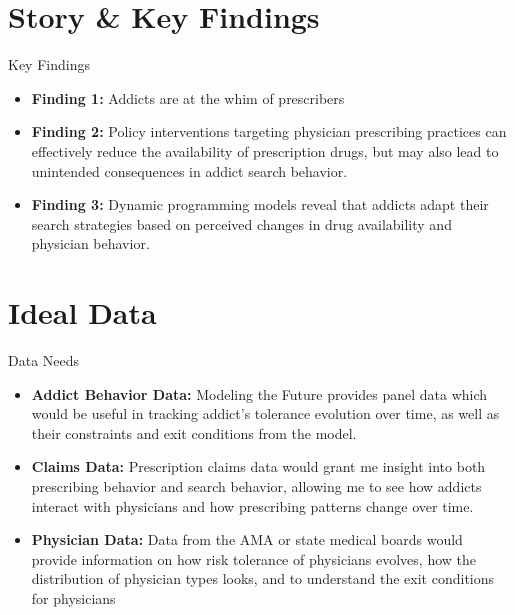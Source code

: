\documentclass[aspectratio=169,professionalfonts]{beamer}
\newcommand{\hl}[1]{\textbf{\textcolor{UGARed}{#1}}}
\begin{document}
\section{Story \& Key Findings}

\begin{frame}{Key Findings}
  \begin{itemize}
    \item \hl{Finding 1:} Addicts are at the whim of prescribers
    \item \hl{Finding 2:} Policy interventions targeting physician prescribing practices can effectively reduce the availability of prescription drugs, but may also lead to unintended consequences in addict search behavior.
    \item \hl{Finding 3:} Dynamic programming models reveal that addicts adapt their search strategies based on perceived changes in drug availability and physician behavior.
  \end{itemize}
\end{frame}


\section{Ideal Data}

  \begin{frame}{Data Needs}
    \begin{itemize}
      \item \hl{Addict Behavior Data:} Modeling the Future provides panel data which would be useful in tracking addict's tolerance evolution over time, as well as their constraints and exit conditions from the model.
      \item \hl{Claims Data:} Prescription claims data would grant me insight into both prescribing behavior and search behavior, allowing me to see how addicts interact with physicians and how prescribing patterns change over time.
      \item \hl{Physician Data:} Data from the AMA or state medical boards would provide information on how risk tolerance of physicians evolves, how the distribution of physician types looks, and to understand the exit conditions for physicians
    \end{itemize}
  \end{frame}
\end{document}
